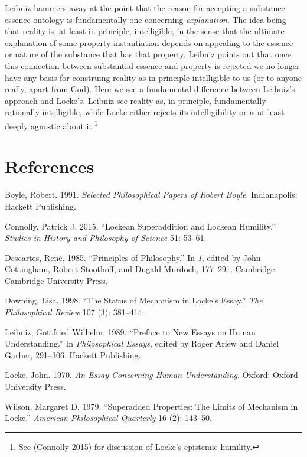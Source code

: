 \documentclass[12pt]{article}
\makeatletter
\newcommand{\citeprocitem}[2]{\hyper@linkstart{cite}{citeproc_bib_item_#1}#2\hyper@linkend}
\makeatother
\begin{document}
Leibniz hammers away at the point that the reason for accepting a substance-essence
ontology is fundamentally one concerning \emph{explanation}. The idea being that reality
is, at least in principle, intelligible, in the sense that the ultimate explanation
of some property instantiation depends on appealing to the essence or nature of the
substance that has that property. Leibniz points out that once this connection
between substantial essence and property is rejected we no longer have any basis for
construing reality as in principle intelligible to us (or to anyone really, apart
from God). Here we see a fundamental difference between Leibniz's approach and
Locke's. Leibniz see reality as, in principle, fundamentally rationally intelligible,
while Locke either rejects its intelligibility or is at least deeply agnostic about
it.\footnote{See (\citeprocitem{2}{Connolly 2015}) for discussion of Locke's epistemic humility.}


\section*{References}
\label{sec:orgcb7a61c}
\begin{hangparas}{1.5em}{1}
\hypertarget{citeproc_bib_item_1}{Boyle, Robert. 1991. \textit{Selected Philosophical Papers of Robert Boyle}. Indianapolis: Hackett Publishing.}

\hypertarget{citeproc_bib_item_2}{Connolly, Patrick J. 2015. “Lockean Superaddition and Lockean Humility.” \textit{Studies in History and Philosophy of Science} 51: 53–61.}

\hypertarget{citeproc_bib_item_3}{Descartes, René. 1985. “Principles of Philosophy.” In \textit{1}, edited by John Cottingham, Robert Stoothoff, and Dugald Murdoch, 177–291. Cambridge: Cambridge University Press.}

\hypertarget{citeproc_bib_item_4}{Downing, Lisa. 1998. “The Status of Mechanism in Locke’s Essay.” \textit{The Philosophical Review} 107 (3): 381–414.}

\hypertarget{citeproc_bib_item_5}{Leibniz, Gottfried Wilhelm. 1989. “Preface to New Essays on Human Understanding.” In \textit{Philosophical Essays}, edited by Roger Ariew and Daniel Garber, 291–306. Hackett Publishing.}

\hypertarget{citeproc_bib_item_6}{Locke, John. 1970. \textit{An Essay Concerning Human Understanding}. Oxford: Oxford University Press.}

\hypertarget{citeproc_bib_item_7}{Wilson, Margaret D. 1979. “Superadded Properties: The Limits of Mechanism in Locke.” \textit{American Philosophical Quarterly} 16 (2): 143–50.}
\end{hangparas}
\end{document}
